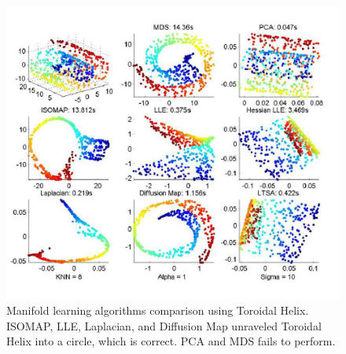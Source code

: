 \begin{figure}[ht]
\begin{center}
\includegraphics[width=\textwidth]{./Figures/App2.png}
\caption{ Manifold learning algorithms comparison using Toroidal Helix. ISOMAP, LLE, Laplacian, and Diffusion Map unraveled Toroidal Helix into a
circle, which is correct. PCA and MDS fails to perform. }
\end{center}
\end{figure}